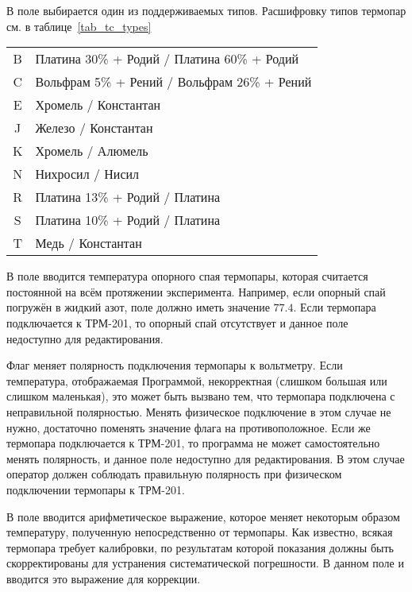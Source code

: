 В поле  выбирается один из поддерживаемых типов. Расшифровку типов термопар см. в таблице~\ref{tab_tc_types}

\begin{table*}
\begin{center}
\caption{Типы термопар}
\begin{tabular}{cl}
\hline \hline
B & Платина 30\% + Родий / Платина 60\% + Родий \\
C & Вольфрам 5\% + Рений / Вольфрам 26\% + Рений \\
E & Хромель / Константан \\
J & Железо / Константан \\
K & Хромель / Алюмель \\
N & Нихросил / Нисил \\
R & Платина 13\% + Родий / Платина \\
S & Платина 10\% + Родий / Платина \\
T & Медь / Константан \\
\hline \hline
\end{tabular}
\label{tab_tc_types}
\end{center}
\end{table*}

В поле  вводится температура опорного спая термопары, которая считается постоянной на всём протяжении эксперимента. Например, если опорный спай погружён в жидкий азот, поле должно иметь значение $77.4$. Если термопара подключается к ТРМ-201, то опорный спай отсутствует и данное поле недоступно для редактирования.

Флаг  меняет полярность подключения термопары к вольтметру. Если температура, отображаемая Программой, некорректная (слишком большая или слишком маленькая), это может быть вызвано тем, что термопара подключена с неправильной полярностью. Менять физическое подключение в этом случае не нужно, достаточно поменять значение флага на противоположное. Если же термопара подключается к ТРМ-201, то программа не может самостоятельно менять полярность, и данное поле недоступно для редактирования. В этом случае оператор должен соблюдать правильную полярность при физическом подключении термопары к ТРМ-201.

В поле  вводится арифметическое выражение, которое меняет некоторым образом температуру, полученную непосредственно от термопары. Как известно, всякая термопара требует калибровки, по результатам которой показания должны быть скорректированы для устранения систематической погрешности. В данном поле и вводится это выражение для коррекции.

